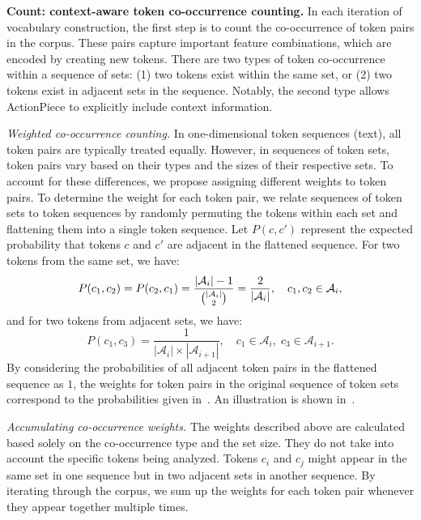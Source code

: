 \textbf{Count: context-aware token co-occurrence counting.} In each iteration of vocabulary construction, the first step is to count the co-occurrence of token pairs in the corpus. These pairs capture important feature combinations, which are encoded by creating new tokens. There are two types of token co-occurrence within a sequence of sets: (1) two tokens exist within the same set, or (2) two tokens exist in adjacent sets in the sequence. Notably, the second type allows ActionPiece to explicitly include context information.

\emph{Weighted co-occurrence counting.} In one-dimensional token sequences (\eg text), all token pairs are typically treated equally. However, in sequences of token sets, token pairs vary based on their types and the sizes of their respective sets. To account for these differences, we propose assigning different weights to token pairs. To determine the weight for each token pair, we relate sequences of token sets to token sequences by randomly permuting the tokens within each set and flattening them into a single token sequence. Let $P(c, c')$ represent the expected probability that tokens \(c\) and \(c'\) are adjacent in the flattened sequence. For two tokens from the same set, we have:
\begin{equation}
    P(c_1, c_2) = P(c_2, c_1) = \frac{|\mathcal{A}_i| - 1}{\tbinom{|\mathcal{A}_i|}{2}} = \frac{2}{|\mathcal{A}_i|}, \quad c_1, c_2 \in \mathcal{A}_i, \label{eq:p_one_set}
\end{equation}
and for two tokens from adjacent sets, we have:
\begin{equation}
    P(c_1, c_3) = \frac{1}{|\mathcal{A}_i| \times |\mathcal{A}_{i + 1}|}, \quad c_1 \in \mathcal{A}_i, \; c_3 \in \mathcal{A}_{i+1}. \label{eq:p_two_sets}
\end{equation}
By considering the probabilities of all adjacent token pairs in the flattened sequence as \(1\), the weights for token pairs in the original sequence of token sets correspond to the probabilities given in~. An illustration is shown in~.

\emph{Accumulating co-occurrence weights.} The weights described above are calculated based solely on the co-occurrence type and the set size. They do not take into account the specific tokens being analyzed. Tokens $c_i$ and $c_j$ might appear in the same set in one sequence but in two adjacent sets in another sequence. By iterating through the corpus, we sum up the weights for each token pair whenever they appear together multiple times.

